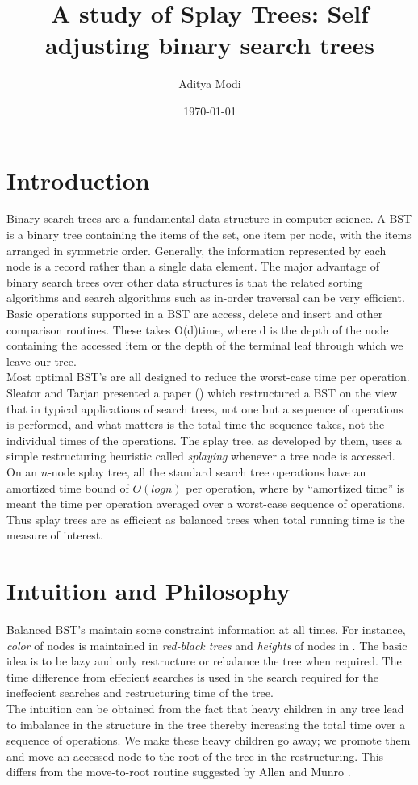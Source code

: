 \documentclass{article}
\author{Aditya Modi}
\title{A study of Splay Trees: Self adjusting binary search trees}
\date{\today}
\begin{document}
\maketitle
\section{Introduction}
Binary search trees are a fundamental data structure in computer science. A BST is a binary tree containing the items of the set, one item per node, with the items arranged in symmetric order. Generally, the information represented by each node is a record rather than a single data element. The major advantage of binary search trees over other data structures is that the related sorting algorithms and search algorithms such as in-order traversal can be very efficient. Basic operations supported in a BST are access, delete and insert and other comparison routines. These takes O(d)time, where d is the depth of the node containing the accessed item or the depth of the terminal leaf through which we leave our tree.\\
Most optimal BST's are all designed to reduce the worst-case time per operation. Sleator and Tarjan presented a paper (\cite{splay}) which restructured a BST on the view that in typical applications of search trees, not one but a sequence of operations is performed, and what matters is the total time the sequence takes, not the individual times of the operations. The splay tree, as developed by them, uses a simple restructuring heuristic called \emph{splaying} whenever a tree node is accessed. On an $n$-node splay tree, all the standard search tree operations have an amortized time bound of $O(log n)$ per operation, where by “amortized time” is meant the time per operation averaged over a worst-case sequence of operations. Thus splay trees are as efficient as balanced trees when total running time is the measure of interest.
\section{Intuition and Philosophy}
Balanced BST's maintain some constraint information at all times. For instance, \emph{color} of nodes is maintained in \emph{red-black trees} and \emph{heights} of nodes in . The basic idea is to be lazy and only restructure or rebalance the tree when required. The time difference from effecient searches is used in the search required for the ineffecient searches and restructuring time of the tree.\\
The intuition can be obtained from the fact that heavy children in any tree lead to imbalance in the structure in the tree thereby increasing the total time over a sequence of operations. We make these heavy children go away; we promote them and move an accessed node to the root of the tree in the restructuring. This differs from the move-to-root routine suggested by Allen and Munro \cite{alm}.
\end{document}
